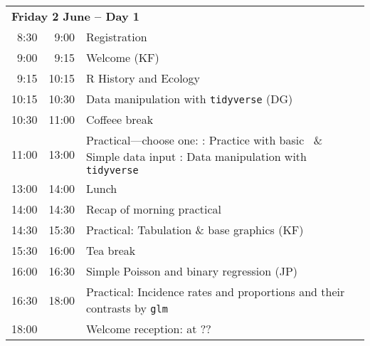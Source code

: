 \noindent
\begin{tabular}{r@{ -- }rp{13cm}}
\multicolumn{3}{l}{\bf Friday 2 June -- Day 1} \\
 8:30 &  9:00 & Registration \\
 9:00 &  9:15 & Welcome (KF) \\
 9:15 & 10:15 & R History and Ecology\\%
10:15 & 10:30 & Data manipulation with \texttt{tidyverse} (DG) \\
10:30 & 11:00 & Coffeee break \\
11:00 & 13:00 & Practical---choose one: \newline
                1: Practice with basic \R\ \& Simple data input \newline
                2: Data manipulation with \texttt{tidyverse} \\

  
13:00 & 14:00 & Lunch \\
14:00 & 14:30 & Recap of morning practical \\
14:30 & 15:30 & Practical: Tabulation \& base graphics (KF)\\ %
15:30 & 16:00 & Tea break\\
16:00 & 16:30 & Simple Poisson and binary regression (JP)\\ %
16:30 & 18:00 & Practical: Incidence rates and proportions and their contrasts by \texttt{glm}\\
18:00 &       & Welcome reception: at ?? \\[1em]
\end{tabular}

